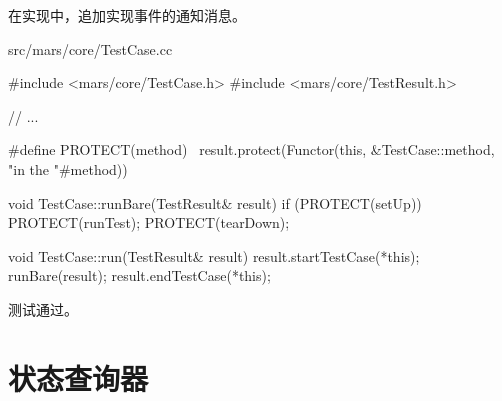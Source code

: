 \begin{content}
在实现中，追加实现事件的通知消息。

\begin{nodiff}{src/mars/core/TestCase.cc}
 \begin{c++}
#include <mars/core/TestCase.h>
#include <mars/core/TestResult.h>

// ...

#define PROTECT(method) \
  result.protect(Functor(this, &TestCase::method,  "in the "#method))

void TestCase::runBare(TestResult& result) {
  if (PROTECT(setUp)) {
    PROTECT(runTest);
  }
  PROTECT(tearDown);
}

void TestCase::run(TestResult& result) {
  result.startTestCase(*this);
  runBare(result);
  result.endTestCase(*this);  
}
 \end{c++}
\end{nodiff}

测试通过。

\end{content}

\section{状态查询器}


